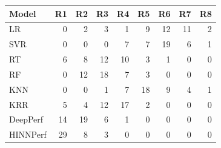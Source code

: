 \begin{tabular}{lrrrrrrrr}
\toprule
Model & R1 & R2 & R3 & R4 & R5 & R6 & R7 & R8 \\
\midrule
LR & 0 & 2 & 3 & 1 & 9 & 12 & 11 & 2 \\
SVR & 0 & 0 & 0 & 7 & 7 & 19 & 6 & 1 \\
RT & 6 & 8 & 12 & 10 & 3 & 1 & 0 & 0 \\
RF & 0 & 12 & 18 & 7 & 3 & 0 & 0 & 0 \\
KNN & 0 & 0 & 1 & 7 & 18 & 9 & 4 & 1 \\
KRR & 5 & 4 & 12 & 17 & 2 & 0 & 0 & 0 \\
DeepPerf & 14 & 19 & 6 & 1 & 0 & 0 & 0 & 0 \\
HINNPerf & 29 & 8 & 3 & 0 & 0 & 0 & 0 & 0 \\
\bottomrule
\end{tabular}
